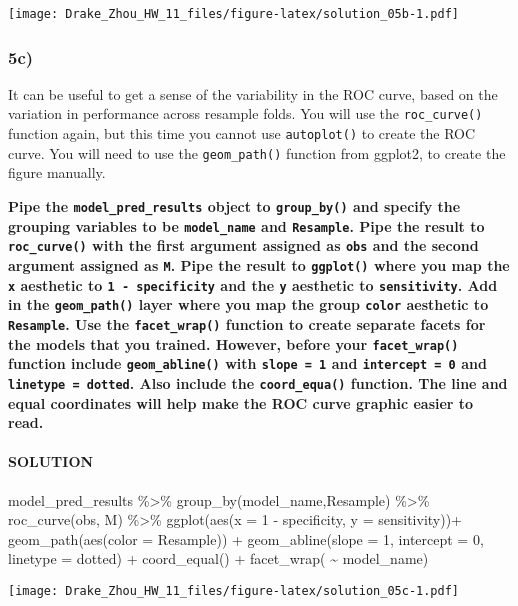 \documentclass[
]{article}
\newenvironment{Shaded}{\begin{snugshade}}{\end{snugshade}}
\newcommand{\AttributeTok}[1]{\textcolor[rgb]{0.77,0.63,0.00}{#1}}
\newcommand{\DecValTok}[1]{\textcolor[rgb]{0.00,0.00,0.81}{#1}}
\newcommand{\FunctionTok}[1]{\textcolor[rgb]{0.00,0.00,0.00}{#1}}
\newcommand{\NormalTok}[1]{#1}
\newcommand{\SpecialCharTok}[1]{\textcolor[rgb]{0.00,0.00,0.00}{#1}}
\newcommand{\StringTok}[1]{\textcolor[rgb]{0.31,0.60,0.02}{#1}}
\begin{document}
\texttt{[image: Drake\_Zhou\_HW\_11\_files/figure-latex/solution\_05b-1.pdf]}

\hypertarget{c-4}{%
\subsubsection{5c)}\label{c-4}}

It can be useful to get a sense of the variability in the ROC curve,
based on the variation in performance across resample folds. You will
use the \texttt{roc\_curve()} function again, but this time you cannot
use \texttt{autoplot()} to create the ROC curve. You will need to use
the \texttt{geom\_path()} function from ggplot2, to create the figure
manually.

\textbf{Pipe the \texttt{model\_pred\_results} object to
\texttt{group\_by()} and specify the grouping variables to be
\texttt{model\_name} and \texttt{Resample}. Pipe the result to
\texttt{roc\_curve()} with the first argument assigned as \texttt{obs}
and the second argument assigned as \texttt{M}. Pipe the result to
\texttt{ggplot()} where you map the \texttt{x} aesthetic to
\texttt{1\ -\ specificity} and the \texttt{y} aesthetic to
\texttt{sensitivity}. Add in the \texttt{geom\_path()} layer where you
map the group \texttt{color} aesthetic to \texttt{Resample}. Use the
\texttt{facet\_wrap()} function to create separate facets for the models
that you trained. However, before your \texttt{facet\_wrap()} function
include \texttt{geom\_abline()} with \texttt{slope\ =\ 1} and
\texttt{intercept\ =\ 0} and
\texttt{linetype\ =\ \textquotesingle{}dotted\textquotesingle{}}. Also
include the \texttt{coord\_equa()} function. The line and equal
coordinates will help make the ROC curve graphic easier to read.}

\hypertarget{solution-25}{%
\paragraph{SOLUTION}\label{solution-25}}

\begin{Shaded}
\begin{Highlighting}[]
\NormalTok{model\_pred\_results }\SpecialCharTok{\%\textgreater{}\%}
  \FunctionTok{group\_by}\NormalTok{(model\_name,Resample) }\SpecialCharTok{\%\textgreater{}\%}
  \FunctionTok{roc\_curve}\NormalTok{(obs, M) }\SpecialCharTok{\%\textgreater{}\%}
  \FunctionTok{ggplot}\NormalTok{(}\FunctionTok{aes}\NormalTok{(}\AttributeTok{x =} \DecValTok{1} \SpecialCharTok{{-}}\NormalTok{ specificity, }\AttributeTok{y =}\NormalTok{ sensitivity))}\SpecialCharTok{+}
  \FunctionTok{geom\_path}\NormalTok{(}\FunctionTok{aes}\NormalTok{(}\AttributeTok{color =}\NormalTok{ Resample)) }\SpecialCharTok{+} 
  \FunctionTok{geom\_abline}\NormalTok{(}\AttributeTok{slope =} \DecValTok{1}\NormalTok{, }\AttributeTok{intercept =} \DecValTok{0}\NormalTok{, }\AttributeTok{linetype =} \StringTok{\textquotesingle{}dotted\textquotesingle{}}\NormalTok{) }\SpecialCharTok{+} 
  \FunctionTok{coord\_equal}\NormalTok{() }\SpecialCharTok{+}
  \FunctionTok{facet\_wrap}\NormalTok{( }\SpecialCharTok{\textasciitilde{}}\NormalTok{ model\_name)}
\end{Highlighting}
\end{Shaded}

\texttt{[image: Drake\_Zhou\_HW\_11\_files/figure-latex/solution\_05c-1.pdf]}
\end{document}
